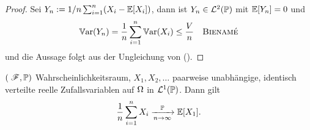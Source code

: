 \begin{proof}
	Sei $Y_n := 1/n \sum_{i=1}^n (X_i - \mathbb{E}[X_i])$, dann ist $Y_n \in \mathcal{L}^{2}(\mathbb{P})$ mit $\mathbb{E}[Y_n] = 0$ und
	\begin{align*}
		\mathbb{V}\text{ar}(Y_n) = \frac{1}{n} \sum_{i=1}^n \mathbb{V}\text{ar}(X_i) \le \frac{V}{n} \quad \text{\textsc{Bienamé}} 
	\end{align*}
	und  die Aussage folgt aus der Ungleichung von  ().
\end{proof}
\begin{proposition}
	$(\; \mathscr F, \mathbb{P})$ Wahrscheinlichkeitsraum, $X_1, X_2, \dots$ paarweise unabhängige, identisch verteilte reelle Zufallsvariablen auf $\Omega$ in $\mathcal{L}^{1}(\mathbb{P})$. Dann gilt
	\begin{align*}
		\frac{1}{n} \sum_{i=1}^n X_i \xrightarrow[n \to \infty]{\mathbb{P}} \mathbb{E}[X_1].
	\end{align*}
\end{proposition}
